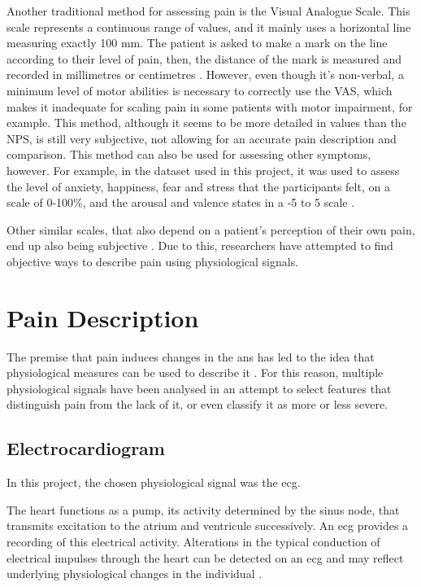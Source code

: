 Another traditional method for assessing pain is the Visual Analogue Scale. This scale represents a continuous range of values, and it mainly uses a horizontal line measuring exactly 100 mm. The patient is asked to make a mark on the line according to their level of pain, then, the distance of the mark is measured and recorded in millimetres or centimetres \cite{Bielewicz2022}. However, even though it’s non-verbal, a minimum level of motor abilities is necessary to correctly use the VAS, which makes it inadequate for scaling pain in some patients with motor impairment, for example. This method, although it seems to be more detailed in values than the NPS, is still very subjective, not allowing for an accurate pain description and comparison. This method can also be used for assessing other symptoms, however. For example, in the dataset used in this project, it was used to assess the level of anxiety, happiness, fear and stress that the participants felt, on a scale of 0-100\%, and the arousal and valence states in a -5 to 5 scale \cite{Alves2024}.

Other similar scales, that also depend on a patient's perception of their own pain, end up also being subjective \cite{Adeboye2021}\cite{Robinson2024}. Due to this, researchers have attempted to find objective ways to describe pain using physiological signals.


\section{Pain Description}

The premise that pain induces changes in the \ac{ans} has led to the idea that physiological measures can be used to describe it \cite{Rojas2023}. For this reason, multiple physiological signals have been analysed in an attempt to select features that distinguish pain from the lack of it, or even classify it as more or less severe. 






\subsection{Electrocardiogram}

In this project, the chosen physiological signal was the \ac{ecg}.

The heart functions as a pump, its activity determined by the sinus node, that transmits excitation to the atrium and ventricule successively. An \ac{ecg} provides a recording of this electrical activity. Alterations in the typical conduction of electrical impulses through the heart can be detected on an \ac{ecg} and may reflect underlying physiological changes in the individual \cite{Liu2022}.

